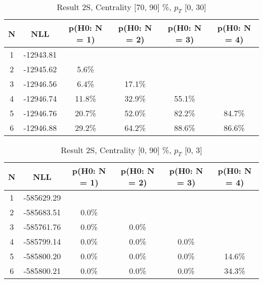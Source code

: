 \begin{table}[htb]
	\begin{center}
	\caption{Result 2S, Centrality [70, 90] \%, $p_{T}$ [0, 30] \GeV
}
{\footnotesize\renewcommand{\arraystretch}{1.4}
		\begin{tabular}{cc||>{\columncolor[gray]{0.8}}cccc}
			N & NLL & p(H0: N = 1) & p(H0: N = 2) & p(H0: N = 3) & p(H0: N = 4)\\ 
		\hline
1 & -12943.81 & & & &\\
2 & -12945.62 & 5.6\% & & &\\
3 & -12946.56 & 6.4\% & 17.1\% & &\\
4 & -12946.74 & 11.8\% & 32.9\% & 55.1\% &\\
5 & -12946.76 & 20.7\% & 52.0\% & 82.2\% & 84.7\%\\
6 & -12946.88 & 29.2\% & 64.2\% & 88.6\% & 86.6\% \\
	\end{tabular}
		\label{tab:lab}
	}
	\end{center}\end{table}

\begin{table}[htb]
	\begin{center}
	\caption{Result 2S, Centrality [0, 90] \%, $p_{T}$ [0, 3] \GeV
}
{\footnotesize\renewcommand{\arraystretch}{1.4}
		\begin{tabular}{cc||ccc>{\columncolor[gray]{0.8}}c}
			N & NLL & p(H0: N = 1) & p(H0: N = 2) & p(H0: N = 3) & p(H0: N = 4)\\ 
		\hline
1 & -585629.29 & & & &\\
2 & -585683.51 & 0.0\% & & &\\
3 & -585761.76 & 0.0\% & 0.0\% & &\\
4 & -585799.14 & 0.0\% & 0.0\% & 0.0\% &\\
5 & -585800.20 & 0.0\% & 0.0\% & 0.0\% & 14.6\%\\
6 & -585800.21 & 0.0\% & 0.0\% & 0.0\% & 34.3\% \\
	\end{tabular}
		\label{tab:lab}
	}
	\end{center}\end{table}

